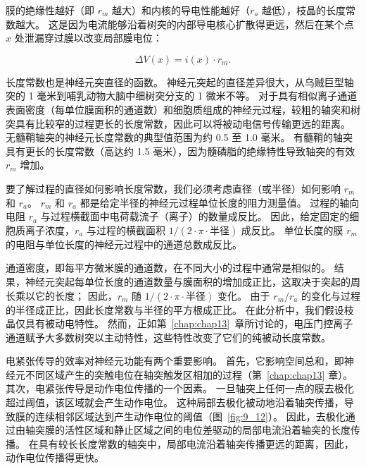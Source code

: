 膜的绝缘性越好（即 $r_m$ 越大）和内核的导电性能越好（$r_a$ 越低），枝晶的长度常数越大。
这是因为电流能够沿着树突的内部导电核心扩散得更远，然后在某个点 $x$ 处泄漏穿过膜以改变局部膜电位：

\begin{equation}
	\Delta V(x) = i(x) \cdot r_m.
\end{equation}


长度常数也是神经元突直径的函数。
神经元突起的直径差异很大，从乌贼巨型轴突的 1 毫米到哺乳动物大脑中细树突分支的 1 微米不等。
对于具有相似离子通道表面密度（每单位膜面积的通道数）和细胞质组成的神经元过程，较粗的轴突和树突具有比较窄的过程更长的长度常数，因此可以将被动电信号传输更远的距离。
无髓鞘轴突的神经元长度常数的典型值范围为约 0.5 至 1.0 毫米。
有髓鞘的轴突具有更长的长度常数（高达约 1.5 毫米），因为髓磷脂的绝缘特性导致轴突的有效 $r_m$ 增加。


要了解过程的直径如何影响长度常数，我们必须考虑直径（或半径）如何影响 $r_m$ 和 $r_a$。
$r_m$ 和 $r_a$ 都是给定半径的神经元过程单位长度的阻力测量值。
过程的轴向电阻 $r_a$ 与过程横截面中电荷载流子（离子）的数量成反比。 
因此，给定固定的细胞质离子浓度，$r_a$ 与过程的横截面积 $1 / (2 \cdot \pi \cdot \texttt{半径})$ 成反比。
单位长度的膜 $r_m$ 的电阻与单位长度的神经元过程中的通道总数成反比。


通道密度，即每平方微米膜的通道数，在不同大小的过程中通常是相似的。
结果，神经元突起每单位长度的通道数量与膜面积的增加成正比，这取决于突起的周长乘以它的长度；
因此，$r_m$ 随 $1 / (2 \cdot \pi \cdot \texttt{半径})$ 变化。
由于 $r_m/r_a$ 的变化与过程的半径成正比，因此长度常数与半径的平方根成正比。
在此分析中，我们假设枝晶仅具有被动电特性。
然而，正如第~\ref{chap:chap13}~章所讨论的，电压门控离子通道赋予大多数树突以主动特性，这些特性改变了它们的纯被动长度常数。


电紧张传导的效率对神经元功能有两个重要影响。
首先，它影响空间总和，即神经元不同区域产生的突触电位在轴突触发区相加的过程（第~\ref{chap:chap13} 章）。
其次，电紧张传导是动作电位传播的一个因素。
一旦轴突上任何一点的膜去极化超过阈值，该区域就会产生动作电位。
这种局部去极化被动地沿着轴突传播，导致膜的连续相邻区域达到产生动作电位的阈值（图~\ref{fig:9_12}）。
因此，去极化通过由轴突膜的活性区域和静止区域之间的电位差驱动的局部电流沿着轴突的长度传播。
在具有较长长度常数的轴突中，局部电流沿着轴突传播更远的距离，因此，动作电位传播得更快。


